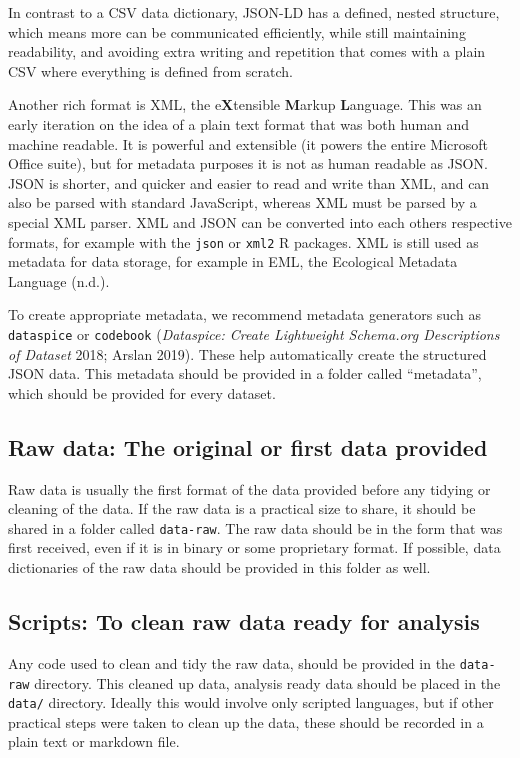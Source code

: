 \documentclass[
]{article}
\begin{document}
In contrast to a CSV data dictionary, JSON-LD has a defined, nested structure, which means more can be communicated efficiently, while still maintaining readability, and avoiding extra writing and repetition that comes with a plain CSV where everything is defined from scratch.

Another rich format is XML, the e\textbf{X}tensible \textbf{M}arkup \textbf{L}anguage. This was an early iteration on the idea of a plain text format that was both human and machine readable. It is powerful and extensible (it powers the entire Microsoft Office suite), but for metadata purposes it is not as human readable as JSON. JSON is shorter, and quicker and easier to read and write than XML, and can also be parsed with standard JavaScript, whereas XML must be parsed by a special XML parser. XML and JSON can be converted into each others respective formats, for example with the \texttt{json} or \texttt{xml2} R packages. XML is still used as metadata for data storage, for example in EML, the Ecological Metadata Language (n.d.).

To create appropriate metadata, we recommend metadata generators such as \texttt{dataspice} or \texttt{codebook} (\emph{Dataspice: Create Lightweight Schema.org Descriptions of Dataset} 2018; Arslan 2019). These help automatically create the structured JSON data. This metadata should be provided in a folder called ``metadata'', which should be provided for every dataset.

\hypertarget{raw-data}{%
\subsection{Raw data: The original or first data provided}\label{raw-data}}

Raw data is usually the first format of the data provided before any tidying or cleaning of the data. If the raw data is a practical size to share, it should be shared in a folder called \texttt{data-raw}. The raw data should be in the form that was first received, even if it is in binary or some proprietary format. If possible, data dictionaries of the raw data should be provided in this folder as well.

\hypertarget{scripts}{%
\subsection{Scripts: To clean raw data ready for analysis}\label{scripts}}

Any code used to clean and tidy the raw data, should be provided in the \texttt{data-raw} directory. This cleaned up data, analysis ready data should be placed in the \texttt{data/} directory. Ideally this would involve only scripted languages, but if other practical steps were taken to clean up the data, these should be recorded in a plain text or markdown file.
\end{document}

